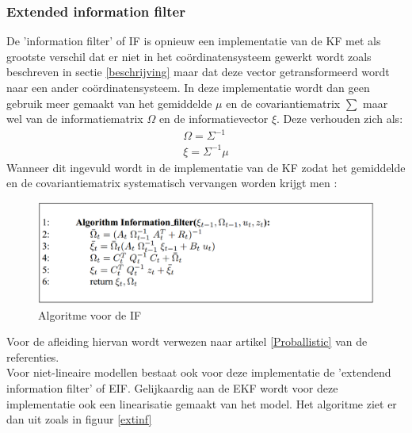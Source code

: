\documentclass{book}
\begin{document}
\subsubsection{Extended information filter}
De 'information filter' of IF is opnieuw een implementatie van de KF met als grootste verschil dat er niet in het coördinatensysteem gewerkt wordt zoals beschreven in sectie \ref{beschrijving} maar dat deze vector getransformeerd wordt naar een ander coördinatensysteem. In deze implementatie wordt dan geen gebruik meer gemaakt van het gemiddelde $\mu$ en de covariantiematrix $\sum$ maar wel van de informatiematrix $\Omega$ en de informatievector $\xi$. Deze verhouden zich als:
\begin{equation}
\label{infor}
\begin{split}
\Omega = \Sigma^{-1} \\ \xi = \Sigma^{-1} \mu
\end{split}
\end{equation}
Wanneer dit ingevuld wordt in de implementatie van de KF zodat het gemiddelde en de covariantiematrix systematisch vervangen worden krijgt men :
\begin{figure}[h!]
	\centering
	\includegraphics[width = \textwidth]{Information}
	\caption{Algoritme voor de IF \cite{Proballistic}}
	\label{information}
\end{figure}
Voor de afleiding hiervan wordt verwezen naar artikel \ref{Proballistic} van de referenties.\\
Voor niet-lineaire modellen bestaat ook voor deze implementatie de 'extendend information filter' of EIF. Gelijkaardig aan de EKF wordt voor deze implementatie ook een linearisatie gemaakt van het model. Het algoritme ziet er dan uit zoals in figuur \ref{extinf}
\end{document}
